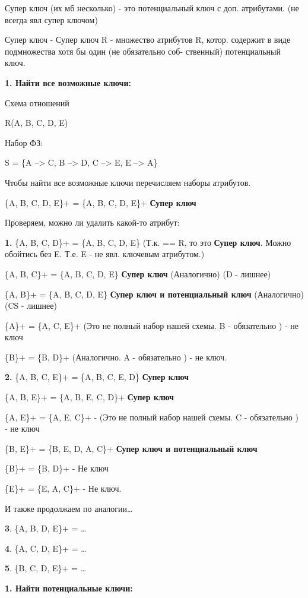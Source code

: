Супер ключ (их мб несколько) - это потенциальный ключ с доп. атрибутами. (не всегда явл супер ключом)

Супер ключ - Супер ключ R - множество атрибутов R, котор.
содержит в виде подмножества хотя бы один (не обязательно соб-
ственный) потенциальный ключ.

\textbf{1. Найти все возможные ключи:}

Схема отношений

R(A, B, C, D, E)

Набор ФЗ:

S = \{A --> C, B --> D, C --> E, E --> A\}

Чтобы найти все возможные ключи перечисляем наборы атрибутов.

\{A, B, C, D, E\}+ = \{A, B, C, D, E\}+ \textbf{Супер ключ}

Проверяем, можно ли удалить какой-то атрибут:

\textbf{1.} \{A, B, C, D\}+ = \{A, B, C, D, E\} (Т.к. == R, то это \textbf{Супер ключ}.
Можно обойтись без E. Т.е. E - не явл. ключевым атрибутом.)

\{A, B, C\}+ = \{A, B, C, D, E\} \textbf{Супер ключ} (Аналогично) (D - лишнее)

\{A, B\}+ = \{A, B, C, D, E\} \textbf{Супер ключ и потенциальный ключ} (Аналогично) (CS - лишнее)

\{A\}+ = \{A, C, E\}+ \textbf{} (Это не полный набор нашей схемы.
B - обязательно ) - не ключ

\{B\}+ = \{B, D\}+ \textbf{} (Аналогично. A - обязательно ) - не ключ.

\textbf{2.}  \{A, B, C, E\}+ = \{A, B, C, E, D\} \textbf{Супер ключ}

\{A, B, E\}+ = \{A, B, E, C, D\}+ \textbf{Супер ключ}

\{A, E\}+ = \{A, E, C\}+ -  (Это не полный набор нашей схемы.
C - обязательно ) - не ключ

\{B, E\}+ = \{B, E, D, A, C\}+  \textbf{Супер ключ и потенциальный ключ}

\{B\}+ = \{B, D\}+ - Не ключ

\{E\}+ =  \{E, A, C\}+ - Не ключ.

И также продолжаем по аналогии\dots

\textbf{3}. \{A, B, D, E\}+ = \dots

\textbf{4}. \{A, C, D, E\}+ = \dots

\textbf{5}. \{B, C, D, E\}+ = \dots

\textbf{1. Найти потенциальные ключи:}

